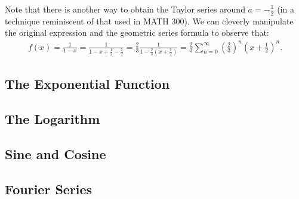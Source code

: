 Note that there is another way to obtain the Taylor series around $a = -\frac{1}{2}$ (in a technique reminiscent of that used in MATH 300). We can cleverly manipulate the original expression and the geometric series formula to observe that:
\begin{align*}
    f(x) = \frac{1}{1 - x} = \frac{1}{1 - x + \frac{1}{2} - \frac{1}{2}} = \frac{2}{3}\frac{1}{1 - \frac{2}{3}(x + \frac{1}{2})} = \frac{2}{3}\sum_{n=0}^\infty \left(\frac{2}{3}\right)^n (x + \frac{1}{2})^n.
\end{align*}


\subsection{The Exponential Function}

\subsection{The Logarithm}

\subsection{Sine and Cosine}

\subsection{Fourier Series}